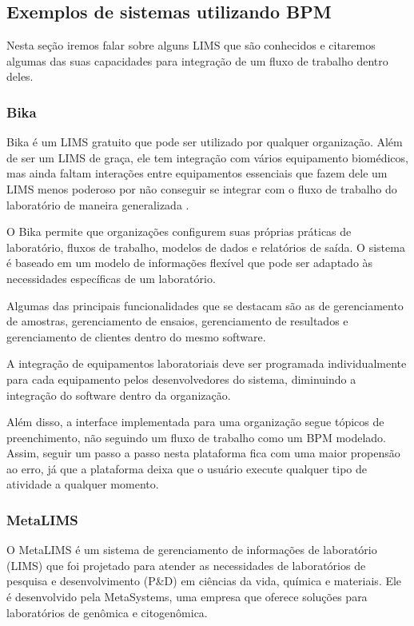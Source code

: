 \subsection{Exemplos de sistemas utilizando BPM} \label{sec:lims-exemplo}

Nesta seção iremos falar sobre alguns LIMS que são conhecidos e citaremos algumas das suas capacidades para integração de um fluxo de trabalho dentro deles.

\subsubsection{Bika}

Bika é um LIMS gratuito que pode ser utilizado por qualquer organização. Além de ser um LIMS de graça, ele tem integração com vários equipamento biomédicos, mas ainda faltam interações entre equipamentos essenciais que fazem dele um LIMS menos poderoso por não conseguir se integrar com o fluxo de trabalho do laboratório de maneira generalizada \cite{Ademuyiwa2018DevelopmentBiobanking}.

O Bika permite que organizações configurem suas próprias práticas de laboratório, fluxos de trabalho, modelos de dados e relatórios de saída. O sistema é baseado em um modelo de informações flexível que pode ser adaptado às necessidades específicas de um laboratório.

Algumas das principais funcionalidades que se destacam são as de gerenciamento de amostras, gerenciamento de ensaios, gerenciamento de resultados e gerenciamento de clientes dentro do mesmo software.

A integração de equipamentos laboratoriais deve ser programada individualmente para cada equipamento pelos desenvolvedores do sistema, diminuindo a integração do software dentro da organização.

Além disso, a interface implementada para uma organização segue tópicos de preenchimento, não seguindo um fluxo de trabalho como um BPM modelado. Assim, seguir um passo a passo nesta plataforma fica com uma maior propensão ao erro, já que a plataforma deixa que o usuário execute qualquer tipo de atividade a qualquer momento.

\subsubsection{MetaLIMS}

O MetaLIMS é um sistema de gerenciamento de informações de laboratório (LIMS) que foi projetado para atender as necessidades de laboratórios de pesquisa e desenvolvimento (P\&D) em ciências da vida, química e materiais. Ele é desenvolvido pela MetaSystems, uma empresa que oferece soluções para laboratórios de genômica e citogenômica.

